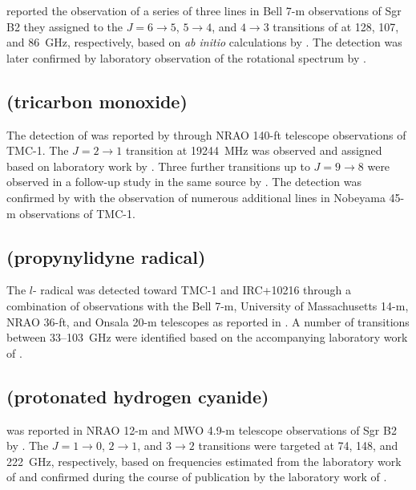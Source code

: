 \documentclass[twocolumn]{aastex631}
\begin{document}
	\citet{Thaddeus:1981uy} reported the observation of a series of three lines in Bell 7-m observations of Sgr B2 they assigned to the $J = 6\rightarrow5$, $5\rightarrow4$, and $4\rightarrow3$ transitions of  at 128, 107, and 86~GHz, respectively, based on \emph{ab initio} calculations by \citet{Green:1976cq}.  The detection was later confirmed by laboratory observation of the rotational spectrum by \citet{Bogey:1984vk}.
	
	\subsection{ (tricarbon monoxide)}
	\label{C3O}
	
	The detection of  was reported by \citet{Matthews:1984hx} through NRAO 140-ft telescope observations of TMC-1.  The $J = 2\rightarrow1$ transition at 19244~MHz was observed and assigned based on laboratory work by \citet{Brown:1983kl}.  Three further transitions up to $J = 9\rightarrow8$ were observed in a follow-up study in the same source by \citet{Brown:1985nw}. The detection was confirmed by \citet{Kaifu:2004tk} with the observation of numerous additional lines in Nobeyama 45-m observations of TMC-1.  
	
	\subsection{ (propynylidyne radical)}
	\label{l-C3H}
	
	The $l$- radical was detected toward TMC-1 and IRC+10216 through a combination of observations with the Bell 7-m, University of Massachusetts 14-m, NRAO 36-ft, and Onsala 20-m telescopes as reported in \citet{Thaddeus:1985vb}.  A number of transitions between 33--103~GHz were identified based on the accompanying laboratory work of \citet{Gottlieb:1985gh}.
	
	\subsection{ (protonated hydrogen cyanide)}
	\label{HCNH+}
	
	 was reported in NRAO 12-m and MWO 4.9-m telescope observations of Sgr B2 by \citet{Ziurys:1986cw}.  The $J = 1\rightarrow0$, $2\rightarrow1$, and $3\rightarrow2$ transitions were targeted at 74, 148, and 222~GHz, respectively, based on frequencies estimated from the laboratory work of \citet{Altman:1984gk} and confirmed during the course of publication by the laboratory work of \citet{Bogey:1985fb}.
	
\end{document}
